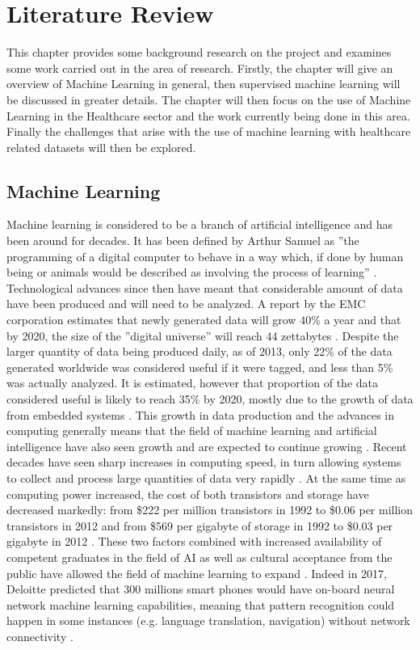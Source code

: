 \chapter{Literature Review}\label{ch:Background}

This chapter provides some background research on the project and examines some work carried out in the area of research. Firstly, the chapter will give an overview of Machine Learning in general, then supervised machine learning will be discussed in greater details. The chapter will then focus on the use of Machine Learning in the Healthcare sector and the work currently being done in this area. Finally the challenges that arise with the use of machine learning with healthcare related datasets will then be explored.  

\section{Machine Learning}
Machine learning is considered to be a branch of artificial intelligence and has been around for decades. It has been defined by Arthur Samuel as ''the programming of a digital computer to behave in a way which, if done by human being or animals would be described as involving the process of learning'' \citep{Samuel:1959vp}.  Technological advances since then have meant that considerable amount of data have been produced and will need to be analyzed. A report by the EMC corporation estimates that newly generated data will grow 40\% a year and that by 2020, the size of the ''digital universe'' will reach 44 zettabytes \citep{EMC:2014ve}. Despite the larger quantity of data being produced daily, as of 2013, only 22\% of the data generated worldwide was considered useful if it were tagged, and less than 5\% was actually analyzed. It is estimated, however that proportion of the data considered useful is likely to reach 35\% by 2020, mostly due to the growth of data from embedded systems \citep{EMC:2014ve}. 
This growth in data production and the advances in computing generally means that the field of machine learning and artificial intelligence have also seen growth and are expected to continue growing \citep{Colombus:wm}. Recent decades have seen sharp increases in computing speed, in turn allowing systems to collect and process large quantities of data very rapidly \citep{Denning:2016fz} . At the same time as computing power increased, the cost of both transistors and storage have decreased markedly: from \$222 per million transistors in 1992 to \$0.06 per million transistors in 2012 and from \$569 per gigabyte of storage in 1992 to \$0.03 per gigabyte in 2012 \citep{Hagel:2013ur}. These two factors combined with increased availability of competent graduates in the field of AI as well as cultural acceptance from the public have allowed the field of machine learning to expand \citep{Evans:sHGdqFvY}. Indeed in 2017, Deloitte predicted that 300 millions smart phones would have on-board neural network machine learning capabilities, meaning that pattern recognition could happen in some instances (e.g. language translation, navigation) without network connectivity \citep{Deloitte:2017wo}.

